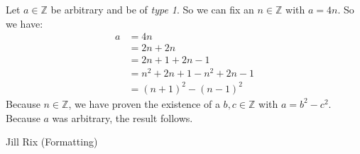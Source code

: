 \documentclass[12pt]{article}
\newenvironment{solution}[1][Solution]
{
	\begin{trivlist} 
		\item[\hskip \labelsep {\itshape #1:}]
	}
	{
	\end{trivlist}
}
\newenvironment{collaborators}[1][Collaborator(s)]
{
	\begin{trivlist} 
		\item[\hskip \labelsep {\bfseries #1:}]
	}
	{
	\end{trivlist}
}
\begin{document}
\begin{solution}
	Let $a \in \mathbb{Z}$ be arbitrary and be of {\em type 1}. So we can fix an $n \in \mathbb{Z}$ with $a=4n$. So we have:
	\begin{align*}
	a&= 4n\\
	 &=2n + 2n\\
	 &=2n+1 + 2n -1\\
	 &=n^2 + 2n + 1 - n^2 + 2n -1\\
	 &=(n+1)^2 - (n-1)^2
	\end{align*}
	Because $n \in \mathbb{Z}$, we have proven the existence of a $b,c \in \mathbb{Z}$ with $a=b^2-c^2$. Because $a$ was arbitrary, the result follows.


\end{solution}
\begin{collaborators}
	Jill Rix (Formatting)
\end{collaborators}
\end{document}

